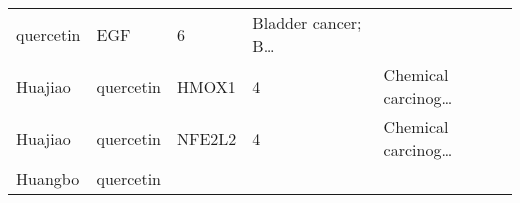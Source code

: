 \documentclass[
]{article}
\begin{document}
\begin{longtable}[]{@{}lllll@{}}
\begin{minipage}[t]{0.16\columnwidth}
quercetin\strut
\end{minipage} & \begin{minipage}[t]{0.12\columnwidth}\raggedright
EGF\strut
\end{minipage} & \begin{minipage}[t]{0.19\columnwidth}\raggedright
6\strut
\end{minipage} & \begin{minipage}[t]{0.21\columnwidth}\raggedright
Bladder cancer; B\ldots{}\strut
\end{minipage}\tabularnewline
\begin{minipage}[t]{0.17\columnwidth}\raggedright
Huajiao\strut
\end{minipage} & \begin{minipage}[t]{0.16\columnwidth}\raggedright
quercetin\strut
\end{minipage} & \begin{minipage}[t]{0.12\columnwidth}\raggedright
HMOX1\strut
\end{minipage} & \begin{minipage}[t]{0.19\columnwidth}\raggedright
4\strut
\end{minipage} & \begin{minipage}[t]{0.21\columnwidth}\raggedright
Chemical carcinog\ldots{}\strut
\end{minipage}\tabularnewline
\begin{minipage}[t]{0.17\columnwidth}\raggedright
Huajiao\strut
\end{minipage} & \begin{minipage}[t]{0.16\columnwidth}\raggedright
quercetin\strut
\end{minipage} & \begin{minipage}[t]{0.12\columnwidth}\raggedright
NFE2L2\strut
\end{minipage} & \begin{minipage}[t]{0.19\columnwidth}\raggedright
4\strut
\end{minipage} & \begin{minipage}[t]{0.21\columnwidth}\raggedright
Chemical carcinog\ldots{}\strut
\end{minipage}\tabularnewline
\begin{minipage}[t]{0.17\columnwidth}\raggedright
Huangbo\strut
\end{minipage} & \begin{minipage}[t]{0.16\columnwidth}\raggedright
quercetin\strut
\end{minipage} & \begin{minipage}[t]{0.12\columnwidth}\raggedright

\end{minipage}
\end{longtable}
\end{document}
